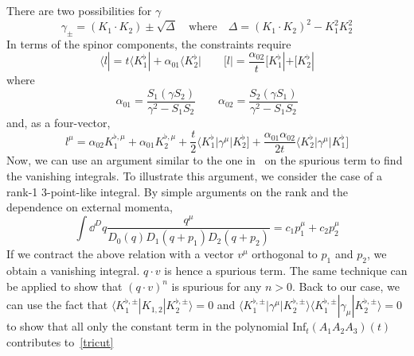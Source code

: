 There are two possibilities for $\gamma$
\begin{equation*}
\gamma_{\pm} = (K_1\cdot K_2) \pm\sqrt{\Delta}\quad
\mathrm{where}\quad
\Delta = (K_1\cdot K_2)^2 - K_1^2K_2^2
\end{equation*}
In terms of the spinor components, the constraints require
\begin{equation*}
\langle l | = t\langle K_1^\flat| + \alpha_{01}\langle K_2^\flat| \quad\quad
[ l | = \frac{\alpha_{02}}{t}[ K_1^\flat| + [ K_2^\flat|
\end{equation*}
where
\begin{equation*}
\alpha_{01} = \frac{S_1(\gamma S_2)}{\gamma^2 - S_1S_2}\quad \quad
\alpha_{02} = \frac{S_2(\gamma S_1)}{\gamma^2 - S_1S_2}
\end{equation*}
%
and, as a four-vector,
\begin{equation*}
l^\mu = \alpha_{02} K_1^{\flat,\mu} + \alpha_{01}K_2^{\flat,\mu} + \frac{t}{2}\langle K_1^\flat | \gamma^\mu |K_2^\flat] + \frac{\alpha_{01}\alpha_{02}}{2t}\langle K_2^\flat|\gamma^\mu |K_1^\flat]
\end{equation*}
%
Now, we can use an argument similar to the one in~\cite{Ossola:2006us} on the spurious term to find the vanishing integrals.
To illustrate this argument, we consider the case of a rank-1 3-point-like integral. 
By simple arguments on the rank and the dependence on external momenta, 
\begin{equation*}
\int\dd^D q \frac{q^\mu}{D_0(q)D_1(q+p_1)D_2(q+p_2)} = c_1p_1^\mu + c_2p_2^\mu
\end{equation*}
If we contract the above relation with a vector $v^\mu$ orthogonal to $p_1$ and $p_2$, we obtain a vanishing integral.
$q\cdot v$ is hence a spurious term.
The same technique can be applied to show that $(q\cdot v)^n$ is spurious for any $n>0$. 
Back to our case, we can use the fact that $\langle K_1^{\flat,\pm} | K_{1,2}|K_2^{\flat,\pm}\rangle = 0 $ and $\langle K_1^{\flat,\pm}|\gamma^\mu|K_{2}^{\flat,\pm}\rangle\langle K_1^{\flat,\pm}|\gamma_\mu|K_{2}^{\flat,\pm}\rangle = 0$
to show that all only the constant term in the polynomial $\mathrm{Inf}_t(A_1A_2A_3)(t)$ contributes to~\cref{tricut}
%
%
